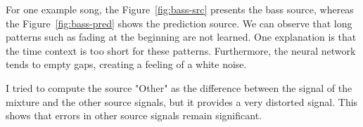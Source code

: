For one example song, the Figure~\ref{fig:bass-src} presents the bass source,
whereas the Figure~\ref{fig:bass-pred} shows the prediction source.
We can observe that long patterns such as fading at the beginning are not learned.
One explanation is that the time context is too short for these patterns.
Furthermore, the neural network tends to empty gaps, creating a feeling of
a white noise.

I tried to compute the source "Other" as the difference between the signal of
the mixture and the other source signals, but it provides a very distorted signal.
This shows that errors in other source signals remain significant.
